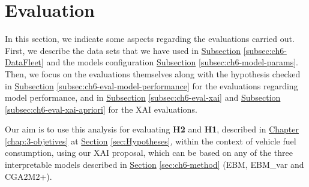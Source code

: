 \begin{table}[h!]
\centering
{}
\caption{Summary of the XAI metrics analysed, linking them to their taxonomy.}
\label{table:ch6-xai-resume-metrics}
\end{table}


\section{Evaluation}\label{sec:ch6-evaluation}
In this section, we indicate some aspects regarding the evaluations carried out. First, we describe the data sets that we have used in \hyperref[subsec:ch6-DataFleet]{Subsection} \ref{subsec:ch6-DataFleet} and the models configuration \hyperref[subsec:ch6-model-params]{Subsection} \ref{subsec:ch6-model-params}. Then, we focus on the evaluations themselves along with the hypothesis checked in \hyperref[subsec:ch6-eval-model-performance]{Subsection} \ref{subsec:ch6-eval-model-performance} for the evaluations regarding model performance, and in \hyperref[subsec:ch6-eval-xai]{Subsection} \ref{subsec:ch6-eval-xai} and \hyperref[subsec:ch6-eval-xai-apriori]{Subsection} \ref{subsec:ch6-eval-xai-apriori} for the XAI evaluations.

Our aim is to use this analysis for evaluating \textbf{H2} and \textbf{H1}, described in \hyperref[chap:3-objetives]{Chapter} \ref{chap:3-objetives} at
\hyperref[sec:Hypotheses]{Section} \ref{sec:Hypotheses}, within the context of vehicle fuel consumption, using our XAI proposal, which can be based on any of the three interpretable models described in \hyperref[sec:ch6-method]{Section} \ref{sec:ch6-method} (EBM, EBM\_var and CGA2M2+).

